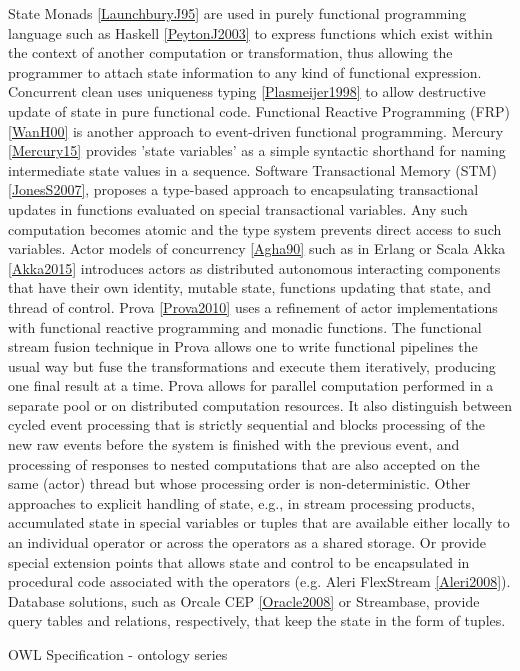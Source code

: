 \documentclass[runningheads]{llncs}
\begin{document}
State Monads \ref{LaunchburyJ95} are used in purely functional programming language such as Haskell \ref{PeytonJ2003} to express functions which exist within the context of another computation or transformation, thus allowing the programmer to attach state information to any kind of functional expression. Concurrent clean uses uniqueness typing \ref{Plasmeijer1998} to allow destructive update of state in pure functional code. Functional Reactive Programming (FRP) \ref{WanH00} is another approach to event-driven functional programming. Mercury \ref{Mercury15} provides 'state variables' as a simple syntactic shorthand for naming intermediate state values in a sequence. Software Transactional Memory (STM) \ref{JonesS2007}, proposes a type-based approach to encapsulating transactional updates in functions evaluated on special transactional variables. Any such computation becomes atomic and the type system prevents direct access to such variables. Actor models of concurrency \ref{Agha90} such as in Erlang or Scala Akka \ref{Akka2015} introduces actors as distributed autonomous interacting components that have their own identity, mutable state, functions updating that state, and thread of control. Prova \ref{Prova2010} uses a refinement of actor implementations with functional reactive programming and monadic functions. The functional stream fusion technique in Prova allows one to write functional pipelines the usual way but fuse the transformations and execute them iteratively, producing one final result at a time. Prova allows for parallel computation performed in a separate pool or on distributed computation resources. It also distinguish between cycled event processing that is strictly sequential and blocks processing of the new raw events before the system is finished with the previous event, and processing of responses to nested computations that are also accepted on the same (actor) thread but whose processing order is non-deterministic. 
Other approaches to explicit handling of state, e.g., in stream processing products, accumulated state in special variables or tuples that are available either locally to an individual operator or across the operators as a shared storage. Or provide special extension points that allows state and control to be encapsulated in procedural code associated with the operators (e.g. Aleri FlexStream \ref{Aleri2008}). Database solutions, such as Orcale CEP \ref{Oracle2008} or Streambase, provide query tables and relations, respectively, that keep the state in the form of tuples. 


OWL Specification - ontology series
\end{document}
